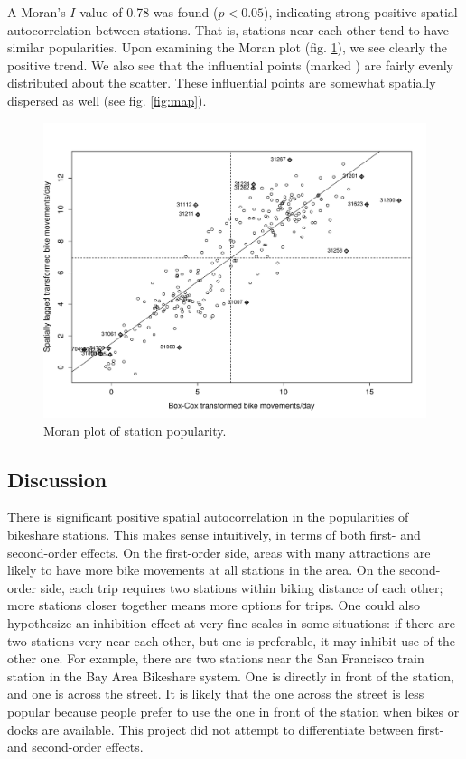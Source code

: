 \documentclass[letterpaper,11pt]{article}
\begin{document}
A Moran's $I$ value of 0.78 was found ($p < 0.05$), indicating strong
positive spatial autocorrelation between stations. That is, stations
near each other tend to have similar popularities. Upon examining the
Moran plot (fig. \ref{fig:moran}), we see clearly the positive
trend. We also see that the influential points (marked
\rlap{\tiny{+}}{$\diamond$}) are fairly evenly distributed about the
scatter. These influential points are somewhat spatially dispersed as
well (see fig. \ref{fig:map}).

\begin{figure}[t]
  \includegraphics[width=\textwidth]{moran_plot.pdf}
  \caption{\label{fig:moran} Moran plot of station popularity.}
\end{figure}



\subsection{Discussion}

There is significant positive spatial autocorrelation in the
popularities of bikeshare stations. This makes sense intuitively, in
terms of both first- and second-order effects. On the first-order
side, areas with many attractions are likely to have more bike
movements at all stations in the area. On the second-order side, each
trip requires two stations within biking distance of each other; more
stations closer together means more options for trips. One could also
hypothesize an inhibition effect at very fine scales in some
situations: if there are two stations very near each other, but one is
preferable, it may inhibit use of the other one. For example, there
are two stations near the San Francisco train station in the Bay Area
Bikeshare system. One is directly in front of the station, and one is
across the street. It is likely that the one across the street is less
popular because people prefer to use the one in front of the station
when bikes or docks are available. This project did not attempt to
differentiate between first- and second-order effects.
\end{document}
